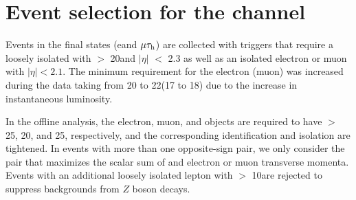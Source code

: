 \section{\texorpdfstring{Event selection for the \leptonTau channel}{Event selection for the lepton-tau channel}}
\label{sect:eleTauCuts}
Events in the \leptonTau final states (e\Tau and $\mu\tau_{\rm h}$)
are collected with triggers that require 
a loosely isolated \Tau with \PT $>$ 20\GeV and $|\eta|$ $<$ 2.3 as well as
an isolated electron or muon with $|\eta| < 2.1$.  The minimum
\PT requirement for the electron (muon) was increased during the data taking from 20 to 22\GeV (17 to 18\GeV)
due to the increase in instantaneous luminosity.

In the offline analysis, the electron, muon, and \Tau objects are required to have \PT $>$ 25, 20, and 25\GeV, respectively, 
and the corresponding identification and isolation are tightened.
In events with more than one opposite-sign \leptonTau pair, we only consider
 the pair that maximizes the scalar sum of \Tau and electron or muon 
transverse momenta.  Events with an additional loosely isolated lepton
with \PT $>$ 10\GeV are rejected to suppress backgrounds from $Z$ boson
decays.  


